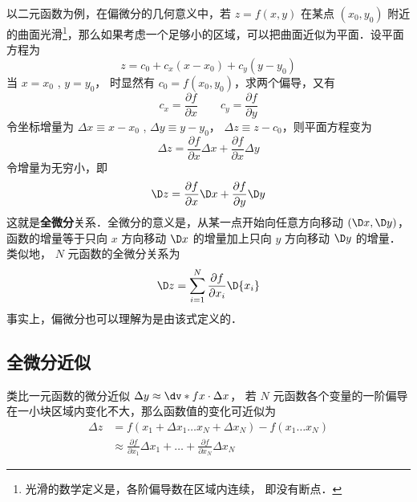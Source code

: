 
以二元函数为例，在偏微分的几何意义中，若 $z = f(x,y)$ 在某点 $({x_0},{y_0})$ 附近的曲面光滑\footnote{光滑的数学定义是，各阶偏导数在区域内连续， 即没有断点．}，那么如果考虑一个足够小的区域，可以把曲面近似为平面．设平面方程为
\begin{equation}
z = {c_0} + {c_x}(x - {x_0}) + {c_y}(y - {y_0})
\end{equation}
当 $x=x_0$ , $y=y_0$， 时显然有 ${c_0} = f({x_0},{y_0})$，求两个偏导，又有
\begin{equation}
{c_x} = \frac{{\partial f}}{{\partial x}} \qquad {c_y} = \frac{{\partial f}}{{\partial y}}
\end{equation}
令坐标增量为 $\Delta x \equiv x - {x_0}$ , $\Delta y \equiv y - {y_0}$，  $\Delta z \equiv z - {c_0}$，则平面方程变为
\begin{equation}
\Delta z = \frac{{\partial f}}{{\partial x}}\Delta x + \frac{{\partial f}}{{\partial x}}\Delta y
\end{equation}
令增量为无穷小，即
 \begin{equation}
\D z = \frac{{\partial f}}{{\partial x}}\D x + \frac{{\partial f}}{{\partial y}}\D y
\end{equation}
这就是\textbf{全微分}关系．全微分的意义是，从某一点开始向任意方向移动 $(\D x,\D y)$，函数的增量等于只向 $x$ 方向移动 $\D x$ 的增量加上只向 $y$ 方向移动 $\D y$ 的增量．类似地， $N$ 元函数的全微分关系为
\begin{equation}
\D z = \sum_{i = 1}^{N}\frac{{\partial f}}{{\partial {x_i}}}\D{x_i}
\end{equation}
事实上，偏微分也可以理解为是由该式定义的．

\subsection{全微分近似}
类比一元函数的微分近似 $\Delta y \approx \dv*{f}{x}\cdot \Delta x$， 若 $N$ 元函数各个变量的一阶偏导在一小块区域内变化不大，那么函数值的变化可近似为
\begin{equation}\label{TDiff_eq6}
\begin{aligned}
\Delta z &= f(x_1+\Delta x_1\ldots x_N + \Delta x_N) - f(x_1\ldots x_N) \\
&\approx \frac{{\partial f}}{{\partial {x_1}}}\Delta {x_1} +\ldots + \frac{{\partial f}}{{\partial {x_N}}}\Delta {x_N}
\end{aligned}\end{equation}

